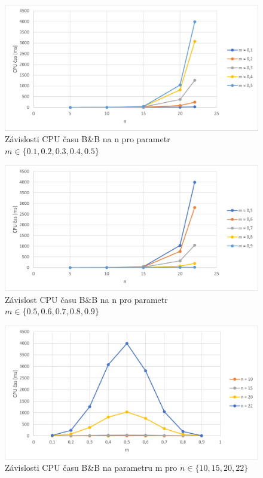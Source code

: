 \documentclass[12pt]{article}
\begin{document}
\begin{figure}[ht]\centering
    \includegraphics[width=1\textwidth, keepaspectratio]{graphs/bnb/bnb_time_n_dep_1.png}
    \caption{Závislosti CPU času B\&B na n pro parametr $m \in \{0.1, 0.2, 0.3, 0.4, 0.5\}$}
    \label{fig:bnb_time_n_dep_1}
\end{figure}

\begin{figure}[ht]\centering
    \includegraphics[width=1\textwidth, keepaspectratio]{graphs/bnb/bnb_time_n_dep_2.png}
    \caption{Závislost CPU času B\&B na n pro parametr $m \in \{0.5, 0.6, 0.7, 0.8, 0.9\}$}
    \label{fig:bnb_time_n_dep_2}
\end{figure}

\begin{figure}[ht]\centering
    \includegraphics[width=1\textwidth, keepaspectratio]{graphs/bnb/bnb_time_m_dep.png}
    \caption{Závislosti CPU času B\&B na parametru m pro $n \in \{10, 15, 20, 22\}$}
    \label{fig:bnb_time_m_dep}
\end{figure}
\end{document}
